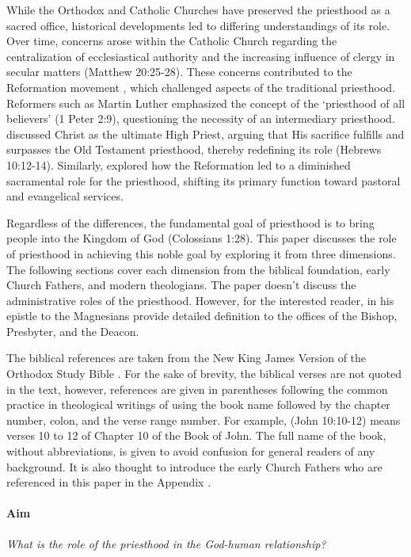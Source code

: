 \documentclass[12pt, doc]{apa7}   	%
\begin{document}
While the Orthodox and Catholic Churches have preserved the priesthood as a sacred office, historical developments led to differing understandings of its role. Over time, concerns arose within the Catholic Church regarding the centralization of ecclesiastical authority and the increasing influence of clergy in secular matters (Matthew 20:25-28). These concerns contributed to the Reformation movement \citep{reformation_lutzer}, which challenged aspects of the traditional priesthood.  Reformers such as Martin Luther \citep{reformation_lull_nelson} emphasized the concept of the ‘priesthood of all believers’ (1 Peter 2:9), questioning the necessity of an intermediary priesthood. \citet{hebrews_wright} discussed Christ as the ultimate High Priest, arguing that His sacrifice fulfills and surpasses the Old Testament priesthood, thereby redefining its role (Hebrews 10:12-14). Similarly, \citet{reformation_macCulloch} explored how the Reformation led to a diminished sacramental role for the priesthood, shifting its primary function toward pastoral and evangelical services.

Regardless of the differences, the fundamental goal of priesthood is to bring people into the Kingdom of God (Colossians 1:28). This paper discusses the role of priesthood in achieving this noble goal by exploring it from three dimensions.  The following sections cover each dimension from the biblical foundation, early Church Fathers, and modern theologians.  The paper doesn't discuss the administrative roles of the priesthood.  However, for the interested reader, \citet{epistles_ignatius} in his epistle to the Magnesians provide detailed definition to the offices of the Bishop, Presbyter, and the Deacon.  

The biblical references are taken from the New King James Version of the Orthodox Study Bible \citep{nelson_nkjv}.  For the sake of brevity, the biblical verses are not quoted in the text, however, references are given in parentheses following the common practice in theological writings of using the book name followed by the chapter number, colon, and the verse range number.  For example, (John 10:10-12) means verses 10 to 12 of Chapter 10 of the Book of John.  The full name of the book, without abbreviations, is given to avoid confusion for general readers of any background.  It is also thought to introduce the early Church Fathers who are referenced in this paper in the Appendix \citep{early_church_akin}.

\vskip 0.5cm
\paragraph{Aim}  \emph{What is the role of the priesthood in the God-human relationship?}
\end{document}
